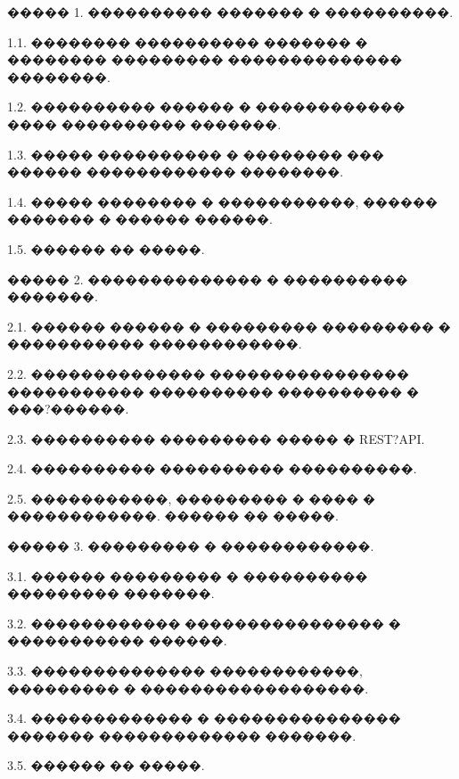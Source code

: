 \documentclass{G7-32}
\begin{document}
����� 1. ���������� ������� � ����������.

1.1. �������� ���������� ������� � �������� ��������� �������������� ��������.  

1.2. ���������� ������ � ������������ ���� ���������� �������.  

1.3. ����� ���������� � �������� ��� ������ ������������ ��������.  

1.4. ����� �������� � �����������, ������ ������� � ������ ������.  

1.5. ������ �� �����.

����� 2. �������������� � ���������� �������.

2.1. ������ ������ � ��������� ��������� � ����������� ������������.  

2.2. �������������� ���������������� ����������� ���������� ���������� � ���?������.  

2.3. ���������� ��������� ����� � REST?API.  

2.4. ���������� ���������� ����������.  

2.5. �����������, ��������� � ���� � ������������. ������ �� �����.

����� 3. ��������� � ������������.

3.1. ������ ��������� � ���������� ��������� �������.  

3.2. ������������ ���������������� � ����������� ������.  

3.3. �������������� ������������, ��������� � ������������������.  

3.4. ������������� � ��������������� ������� ������������� �������.  

3.5. ������ �� �����.
\end{document}
